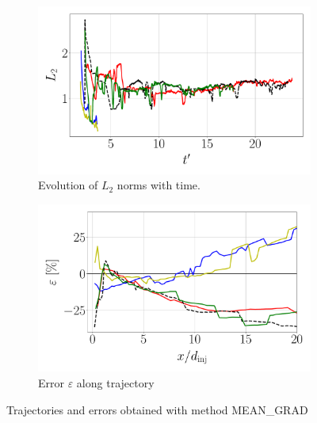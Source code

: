 \begin{figure}[ht]
\begin{subfigure}[b]{0.45\textwidth}
	\centering
   \includegraphics[scale=0.25]{./part2_developments/figures_ch5_resolved_JICF/results_trajectories/methods_expe_validation_L2_evolution.pdf}
   \vspace*{-0.25in}
   \caption{Evolution of $L_2$ norms with time.}
\end{subfigure}
\hspace{0.25in}
\begin{subfigure}[b]{0.45\textwidth}
	\centering
   \includegraphics[scale=0.25]{./part2_developments/figures_ch5_resolved_JICF/results_trajectories/methods_expe_validation_error_with_xD.pdf}
   \vspace*{-0.25in}
   \caption{Error $\varepsilon$ along trajectory}
\end{subfigure}

\caption{Trajectories and errors obtained with method MEAN\_GRAD}
\label{fig:JICF_trajectories_validation}
\end{figure}


